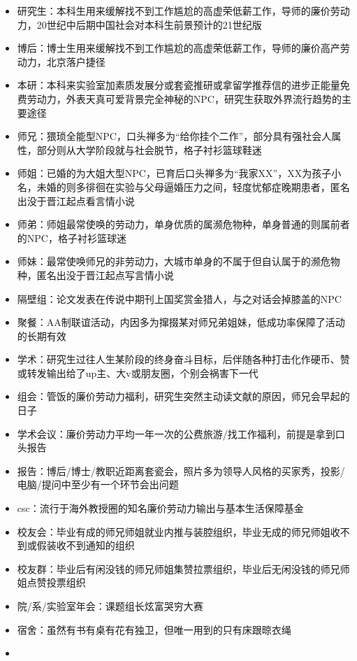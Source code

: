 \documentclass[]{tufte-book}
\providecommand{\tightlist}{%
  \setlength{\itemsep}{0pt}\setlength{\parskip}{0pt}}
\begin{document}
\begin{itemize}
\tightlist
\item
  研究生：本科生用来缓解找不到工作尴尬的高虚荣低薪工作，导师的廉价劳动力，20世纪中后期中国社会对本科生前景预计的21世纪版
\item
  博后：博士生用来缓解找不到工作尴尬的高虚荣低薪工作，导师的廉价高产劳动力，北京落户捷径
\item
  本研：本科来实验室加素质发展分或套瓷推研或拿留学推荐信的进步正能量免费劳动力，外表天真可爱背景完全神秘的NPC，研究生获取外界流行趋势的主要途径
\item
  师兄：猥琐全能型NPC，口头禅多为``给你挂个二作''，部分具有强社会人属性，部分则从大学阶段就与社会脱节，格子衬衫篮球鞋迷
\item
  师姐：已婚的为大姐大型NPC，已育后口头禅多为``我家XX''，XX为孩子小名，未婚的则多徘徊在实验与父母逼婚压力之间，轻度忧郁症晚期患者，匿名出没于晋江起点看言情小说
\item
  师弟：师姐最常使唤的劳动力，单身优质的属濒危物种，单身普通的则属前者的NPC，格子衬衫篮球迷
\item
  师妹：最常使唤师兄的非劳动力，大城市单身的不属于但自认属于的濒危物种，匿名出没于晋江起点写言情小说
\item
  隔壁组：论文发表在传说中期刊上国奖赏金猎人，与之对话会掉膝盖的NPC
\item
  聚餐：AA制联谊活动，内因多为撺掇某对师兄弟姐妹，低成功率保障了活动的长期有效
\item
  学术：研究生过往人生某阶段的终身奋斗目标，后伴随各种打击化作硬币、赞或转发输出给了up主、大v或朋友圈，个别会祸害下一代
\item
  组会：管饭的廉价劳动力福利，研究生突然主动读文献的原因，师兄会早起的日子
\item
  学术会议：廉价劳动力平均一年一次的公费旅游/找工作福利，前提是拿到口头报告
\item
  报告：博后/博士/教职近距离套瓷会，照片多为领导人风格的买家秀，投影/电脑/提问中至少有一个环节会出问题
\item
  csc：流行于海外教授圈的知名廉价劳动力输出与基本生活保障基金
\item
  校友会：毕业有成的师兄师姐就业内推与装腔组织，毕业无成的师兄师姐收不到或假装收不到通知的组织
\item
  校友群：毕业后有闲没钱的师兄师姐集赞拉票组织，毕业后无闲没钱的师兄师姐点赞投票组织
\item
  院/系/实验室年会：课题组长炫富哭穷大赛
\item
  宿舍：虽然有书有桌有花有独卫，但唯一用到的只有床跟晾衣绳
\item

\end{itemize}
\end{document}
